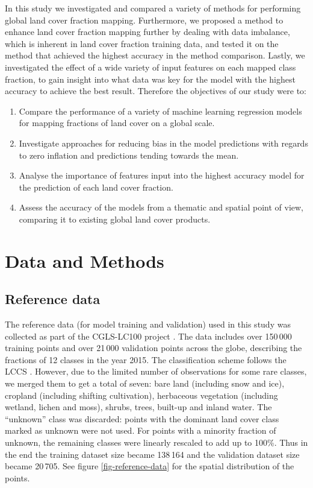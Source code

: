 \documentclass[review,authoryear,3p]{elsarticle}
\begin{document}
In this study we investigated and compared a variety of methods for performing global land cover fraction mapping.
Furthermore, we proposed a method to enhance land cover fraction mapping further by dealing with data imbalance, which is inherent in land cover fraction training data, and tested it on the method that achieved the highest accuracy in the method comparison.
Lastly, we investigated the effect of a wide variety of input features on each mapped class fraction, to gain insight into what data was key for the model with the highest accuracy to achieve the best result.
Therefore the objectives of our study were to:

\begin{enumerate}
 \item Compare the performance of a variety of machine learning regression models for mapping fractions of land cover on a global scale.
 \item Investigate approaches for reducing bias in the model predictions with regards to zero inflation and predictions tending towards the mean.
 \item Analyse the importance of features input into the highest accuracy model for the prediction of each land cover fraction.
 \item Assess the accuracy of the models from a thematic and spatial point of view, comparing it to existing global land cover products.
\end{enumerate}

\section{Data and Methods}

\subsection{Reference data}

The reference data (for model training and validation) used in this study was collected as part of the \ac{CGLS-LC100} project \citep{buchhorn_copernicus_2020, nandin-erdene_tsendbazar_copernicus_2019}.
The data includes over 150\,000 training points and over 21\,000 validation points across the globe, describing the fractions of 12 classes in the year 2015.
The classification scheme follows the \gls{LCCS} \citep{buchhorn_copernicus_2020}.
However, due to the limited number of observations for some rare classes, we merged them to get a total of seven: bare land (including snow and ice), cropland (including shifting cultivation), herbaceous vegetation (including wetland, lichen and moss), shrubs, trees, built-up and inland water.
The ``unknown'' class was discarded: points with the dominant land cover class marked as unknown were not used.
For points with a minority fraction of unknown, the remaining classes were linearly rescaled to add up to 100\%.
Thus in the end the training dataset size became 138\,164 and the validation dataset size became 20\,705. See figure \ref{fig-reference-data} for the spatial distribution of the points.
\end{document}

